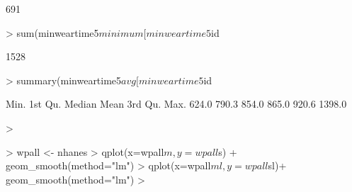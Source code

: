 \documentclass[11pt]{article}
\begin{document}
\begin{Schunk}
\begin{Sinput}
\end{Sinput}
\begin{Soutput}
[1] 691
\end{Soutput}
\begin{Sinput}
> sum(minweartime5$minimum[minweartime5$id %in% id57complete] > 700)
\end{Sinput}
\begin{Soutput}
[1] 1528
\end{Soutput}
\begin{Sinput}
> summary(minweartime5$avg[minweartime5$id %in% id57complete])
\end{Sinput}
\begin{Soutput}
   Min. 1st Qu.  Median    Mean 3rd Qu.    Max. 
  624.0   790.3   854.0   865.0   920.6  1398.0 
\end{Soutput}
\begin{Sinput}
> 
\end{Sinput}
\end{Schunk}


\begin{Schunk}
\begin{Sinput}
> wpall <- nhanes %>% group_by(id)  %>% summarise(m=mean(modvigmin),s=sd(modvigmin),ml=mean(log(modvigmin)),sl=sd(log(modvigmin)))
> qplot(x=wpall$m,y=wpall$s) + geom_smooth(method="lm")
> qplot(x=wpall$ml,y=wpall$sl)+ geom_smooth(method="lm")
> 
\end{Sinput}
\end{Schunk}
\end{document}

